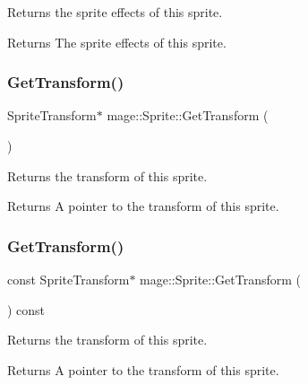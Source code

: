 Returns the sprite effects of this sprite.

\begin{DoxyReturn}{Returns}
The sprite effects of this sprite. 
\end{DoxyReturn}
\hypertarget{classmage_1_1_sprite_aa28e031e38c51619b3bd7853d212ae06}{}\label{classmage_1_1_sprite_aa28e031e38c51619b3bd7853d212ae06} 
\subsubsection{\texorpdfstring{Get\+Transform()}{GetTransform()}\hspace{0.1cm}{\footnotesize\ttfamily [1/2]}}
{\footnotesize\ttfamily Sprite\+Transform$\ast$ mage\+::\+Sprite\+::\+Get\+Transform (\begin{DoxyParamCaption}{ }\end{DoxyParamCaption})\hspace{0.3cm}{\ttfamily [noexcept]}}

Returns the transform of this sprite.

\begin{DoxyReturn}{Returns}
A pointer to the transform of this sprite. 
\end{DoxyReturn}
\hypertarget{classmage_1_1_sprite_a8e2c0ae634492efacc92aab2e18e701c}{}\label{classmage_1_1_sprite_a8e2c0ae634492efacc92aab2e18e701c} 
\subsubsection{\texorpdfstring{Get\+Transform()}{GetTransform()}\hspace{0.1cm}{\footnotesize\ttfamily [2/2]}}
{\footnotesize\ttfamily const Sprite\+Transform$\ast$ mage\+::\+Sprite\+::\+Get\+Transform (\begin{DoxyParamCaption}{ }\end{DoxyParamCaption}) const\hspace{0.3cm}{\ttfamily [noexcept]}}

Returns the transform of this sprite.

\begin{DoxyReturn}{Returns}
A pointer to the transform of this sprite. 
\end{DoxyReturn}
\hypertarget{classmage_1_1_sprite_aa24dfc716d8b79cc16b4c27409f8cc6b}{}\label{classmage_1_1_sprite_aa24dfc716d8b79cc16b4c27409f8cc6b} 
